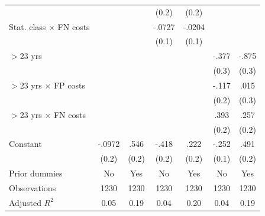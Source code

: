 \begin{tabular}{l*{6}{c}}
                &                  &                  &    (0.2)         &    (0.2)         &                  &                  \\
Stat. class $\times$ FN costs&                  &                  &   -.0727         &   -.0204         &                  &                  \\
                &                  &                  &    (0.1)         &    (0.1)         &                  &                  \\
$>$23 yrs       &                  &                  &                  &                  &    -.377         &    -.875\sym{***}\\
                &                  &                  &                  &                  &    (0.3)         &    (0.3)         \\
$>$23 yrs $\times$ FP costs&                  &                  &                  &                  &    -.117         &     .015         \\
                &                  &                  &                  &                  &    (0.2)         &    (0.3)         \\
$>$23 yrs $\times$ FN costs&                  &                  &                  &                  &     .393\sym{**} &     .257         \\
                &                  &                  &                  &                  &    (0.2)         &    (0.2)         \\
Constant        &   -.0972         &     .546\sym{***}&    -.418\sym{**} &     .222         &    -.252\sym{**} &     .491\sym{***}\\
                &    (0.2)         &    (0.2)         &    (0.2)         &    (0.2)         &    (0.1)         &    (0.2)         \\
Prior dummies   &       No         &      Yes         &       No         &      Yes         &       No         &      Yes         \\
\hline
Observations    &     1230         &     1230         &     1230         &     1230         &     1230         &     1230         \\
Adjusted \(R^{2}\)&     0.05         &     0.19         &     0.04         &     0.20         &     0.04         &     0.19         \\
\hline\hline
\end{tabular}

